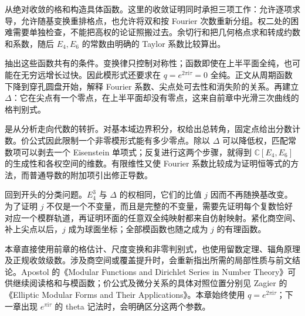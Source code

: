 \ProseParagraphBreak
{}从绝对收敛的格和构造具体函数。这里的收敛证明同时承担三项工作：允许逐项求导，允许随基变换重排格点，也允许将双和按 Fourier 次数重新分组。权二处的困难需要单独检查，不能把高权的论证照搬过去。余切行和把几何格点求和转成约数和系数，随后 \(E_4,E_6\) 的常数由明确的 Taylor 系数比较算出。

\ProseParagraphBreak
{}抽出这些函数共有的条件。变换律只控制对称性；函数即使在上半平面全纯，也可能在无穷远增长过快。因此模形式还要求在 \(q=e^{2\pi\mathrm{i}\tau}=0\) 全纯。正文从周期函数下降到穿孔圆盘开始，解释 Fourier 系数、尖点处可去性和消失阶的关系。再建立 \(\Delta\)：它在尖点有一个零点，在上半平面却没有零点，这来自前章中光滑三次曲线的格判别式。

\ProseParagraphBreak
{}是从分析走向代数的转折。对基本域边界积分，权给出总转角，固定点给出分数计数。价公式因此限制一个非零模形式能有多少零点。除以 \(\Delta\) 可以降低权，匹配常数项可以剥去一个 Eisenstein 单项式；反复进行这两个步骤，就得到 \(\mathbb C[E_4,E_6]\) 的生成性和各权空间的维数。有限维性又使 Fourier 系数比较成为证明恒等式的方法，而普通导数的附加项引出修正导数。

\ProseParagraphBreak
{}回到开头的分类问题。\(E_4^3\) 与 \(\Delta\) 的权相同，它们的比值 \(j\) 因而不再随换基改变。为了证明 \(j\) 不仅是一个不变量，而且是完整的不变量，需要先证明每个复数恰好对应一个模群轨道，再证明环面的任意双全纯映射都来自仿射映射。紧化商空间、补上尖点以后，\(j\) 成为球面坐标；全部模函数也随之成为 \(j\) 的有理函数。

\ProseParagraphBreak
本章直接使用前章的格估计、尺度变换和非零判别式，也使用留数定理、辐角原理及正规收敛级数。涉及商空间或覆盖提升时，会重新指出所需的局部性质与前文结论。Apostol 的《Modular Functions and Dirichlet Series in Number Theory》\cite{Apostol1990Modular}可供继续阅读格和与模函数；价公式及微分关系的具体对照位置分别见 Zagier 的《Elliptic Modular Forms and Their Applications》\cite[Proposition 2, pp.~9--10; Proposition 15, p.~49]{Zagier2008Elliptic}。本章始终使用 \(q=e^{2\pi\mathrm{i}\tau}\)；下一章出现 \(e^{\pi\mathrm{i}\tau}\) 的 theta 记法时，会明确区分这两个参数。









